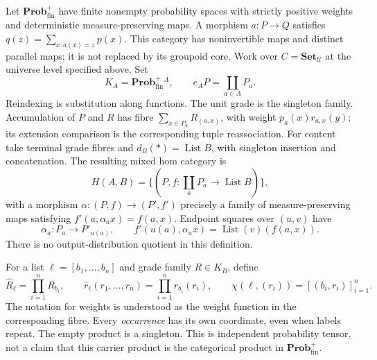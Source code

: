 \documentclass[11pt]{article}
\theoremstyle{definition}
\newcommand{\Set}{\mathbf{Set}}
\newcommand{\Prob}{\mathbf{Prob}^{+}_{\mathrm{fin}}}
\newcommand{\List}{\operatorname{List}}
\begin{document}
Let $\Prob$ have finite nonempty probability spaces with strictly positive
weights and deterministic measure-preserving maps. A morphism $a:P\to Q$
satisfies $q(z)=\sum_{x:a(x)=z}p(x)$. This category has noninvertible maps and
distinct parallel maps; it is not replaced by its groupoid core. Work over
$C=\Set_{\mathcal U}$ at the universe level specified above. Set
\[
 K_A=\Prob^A,\qquad e_AP=\coprod_{a\in A}P_a.
\]
Reindexing is substitution along functions. The unit grade is the singleton
family. Accumulation of $P$ and $R$ has fibre
$\sum_{x\in P_a}R_{(a,x)}$, with weight $p_a(x)r_{a,x}(y)$; its extension
comparison is the corresponding tuple reassociation. For content take
terminal grade fibres and $d_B(*)=\List B$, with singleton insertion and
concatenation. The resulting mixed hom category is
\[
 H(A,B)=\{(P,f:\textstyle\coprod_aP_a\to\List B)\},
\]
with a morphism $\alpha:(P,f)\to(P',f')$ precisely a family of
measure-preserving maps satisfying $f'(a,\alpha_a x)=f(a,x)$.
Endpoint squares over $(u,v)$ have
\begin{equation}\label{eq:probsquare}
 \alpha_a:P_a\to P'_{u(a)},\qquad
 f'(u(a),\alpha_ax)=\List(v)(f(a,x)).
\end{equation}
There is no output-distribution quotient in this definition.

For a list $\ell=[b_1,\ldots,b_n]$ and grade family $R\in K_B$, define
\begin{equation}\label{eq:probchi}
 \widehat R_\ell=\prod_{i=1}^nR_{b_i},\qquad
 \widehat r_\ell(r_1,\ldots,r_n)=\prod_{i=1}^nr_{b_i}(r_i),\qquad
 \chi(\ell,(r_i))=[(b_i,r_i)]_{i=1}^n.
\end{equation}
The notation for weights is understood as the weight function in the
corresponding fibre. Every \emph{occurrence} has its own coordinate, even
when labels repeat. The empty product is a singleton. This is independent
probability tensor, not a claim that this carrier product is the categorical
product in $\Prob$.
\end{document}
